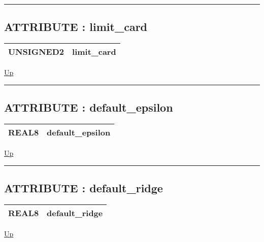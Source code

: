 \rule{\textwidth}{0.4pt}

\subsection*{ATTRIBUTE : limit\_card}
\hypertarget{ecldoc:logisticregression.constants.limit_card}{}

{\renewcommand{\arraystretch}{1.5}
\begin{tabularx}{\textwidth}{|>{\raggedright\arraybackslash}l|X|}
\hline
\hspace{0pt}UNSIGNED2 & limit\_card \\
\hline
\end{tabularx}
}

\hyperlink{ecldoc:LogisticRegression.Constants}{Up}

\par


\rule{\textwidth}{0.4pt}
\subsection*{ATTRIBUTE : default\_epsilon}
\hypertarget{ecldoc:logisticregression.constants.default_epsilon}{}

{\renewcommand{\arraystretch}{1.5}
\begin{tabularx}{\textwidth}{|>{\raggedright\arraybackslash}l|X|}
\hline
\hspace{0pt}REAL8 & default\_epsilon \\
\hline
\end{tabularx}
}

\hyperlink{ecldoc:LogisticRegression.Constants}{Up}

\par


\rule{\textwidth}{0.4pt}
\subsection*{ATTRIBUTE : default\_ridge}
\hypertarget{ecldoc:logisticregression.constants.default_ridge}{}

{\renewcommand{\arraystretch}{1.5}
\begin{tabularx}{\textwidth}{|>{\raggedright\arraybackslash}l|X|}
\hline
\hspace{0pt}REAL8 & default\_ridge \\
\hline
\end{tabularx}
}

\hyperlink{ecldoc:LogisticRegression.Constants}{Up}

